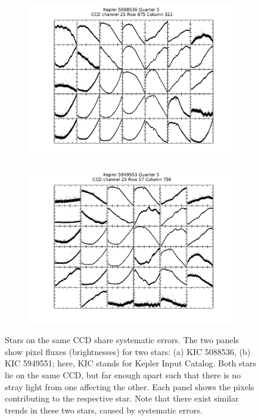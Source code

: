 \documentclass[12pt, preprint]{aastex}
\begin{document}
\begin{figure}[htb]
\centering
\begin{subfigure}[htb]{0.48\columnwidth}
\includegraphics[width=\columnwidth]{5088536-5}
\caption{}
\end{subfigure}%
\hfill
\begin{subfigure}[htb]{0.48\columnwidth}
\includegraphics[width=\columnwidth]{5949551-5}
\caption{}
\end{subfigure}
\caption{\label{ccd} Stars on the same CCD share systematic errors. 
The two panels show pixel fluxes (brightnesses) for two stars: (a) KIC 5088536, (b) KIC 5949551; 
here, KIC stands for Kepler Input Catalog. Both stars lie on the same CCD, 
but far enough apart such that there is no stray light from one affecting the other. 
Each panel shows the pixels contributing to the respective star. 
Note that there exist similar trends in these two stars, caused by systematic errors. 
}
\end{figure}
\end{document}

